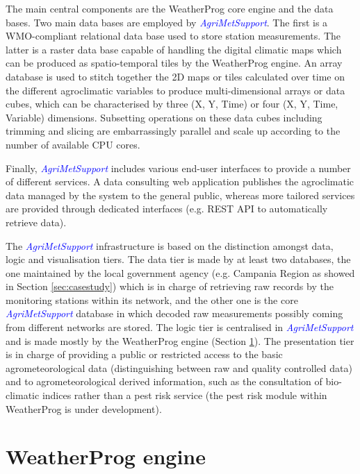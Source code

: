 \documentclass[authoryear,preprint,review,12pt]{elsarticle}
\newcommand{\note}[1]{\emph{\textcolor{red}{#1}}}
\newcommand{\update}[1]{\emph{\textcolor{blue}{#1}}}
\newcommand{\gci}{\update{AgriMetSupport}\xspace}
\begin{document}
The main central components are the WeatherProg core engine and the data bases. 
Two main data bases are employed by \gci.
The first is a WMO-compliant relational data base used to store station measurements.
The latter  is a raster data base capable of handling the digital climatic maps which can be produced as spatio-temporal tiles by the WeatherProg engine.
An array database is used to stitch together the 2D maps or tiles calculated over time on the different agroclimatic variables to produce multi-dimensional arrays or data cubes, which can be  characterised by three (X, Y, Time) or four (X, Y, Time, Variable) dimensions.
Subsetting operations on these data cubes including trimming and slicing are embarrassingly parallel and scale up according to the number of available CPU cores.

Finally, \gci includes various end-user interfaces to provide a number of different services.
A data consulting web application publishes the agroclimatic data managed by the system to the general public, whereas more tailored services are provided through dedicated interfaces (e.g. REST API to automatically retrieve data).

The \gci infrastructure is based on the distinction amongst data, logic and visualisation tiers.
The data tier is made by at least two databases, the one maintained by the local government agency (e.g. Campania Region as showed in Section \ref{sec:casestudy}) which is in charge of retrieving raw records by the monitoring stations within its network, and the other one is the core \gci database in which decoded raw measurements possibly coming from different networks are stored.
The logic tier is centralised in \gci and is made mostly by the WeatherProg engine (Section \ref{sec:weatherprog}).
The presentation tier is in charge of providing a public or restricted access to the basic agrometeorological data (distinguishing between raw and quality controlled data) and to agrometeorological derived information, such as the consultation of bio-climatic indices rather than a pest risk service (the pest risk module within WeatherProg is under development).

\section{WeatherProg engine}\label{sec:weatherprog}
\end{document}
